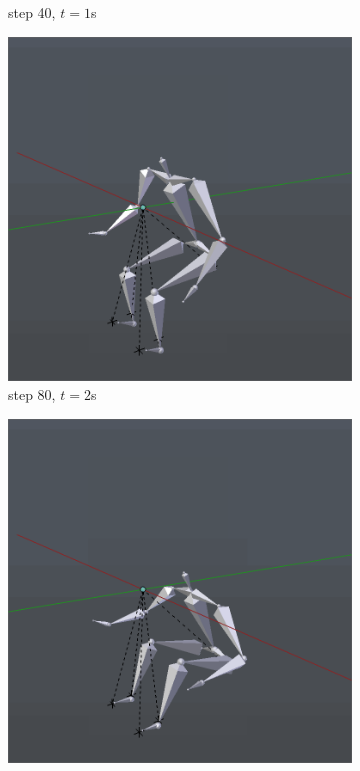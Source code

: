 \documentclass[10pt,twocolumn,letterpaper]{article}
\begin{document}
\begin{figure}
\begin{subfigure}{0.2\textwidth}
        \caption{step 40, $t=1$s}
    \end{subfigure}\begin{subfigure}{0.2\textwidth}
        \centering
        \includegraphics[width=.9\linewidth]{sit-2.png}
        \caption{step 80, $t=2$s}
    \end{subfigure}\begin{subfigure}{0.2\textwidth}
        \centering
        \includegraphics[width=.9\linewidth]{sit-3.png}

\end{subfigure}
\end{figure}
\end{document}
